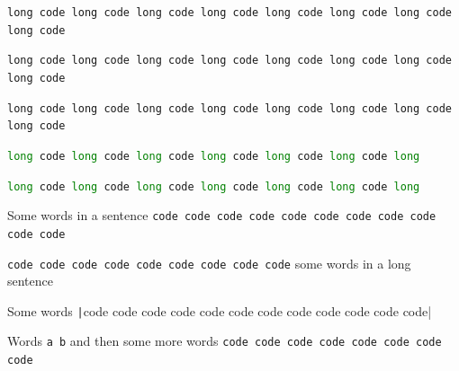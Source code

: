 \documentclass{article}
\begin{document}

\lstinline{long code long code long code long code long code long code long code long code}

\lstinline|long code long code long code long code long code long code long code long code|

\lstinline+long code long code long code long code long code long code long code long code+

\lstinline[language=Python]|long code long code long code long code long code long code long|

\lstinline[language=Python]{long code long code long code long code long code long code long}


Some words in a sentence
\lstinline{code code code code code code code code code code code}

\lstinline!code code code code code code code code code! some words
in a long sentence


Some words
\texttt|code code code code code code code code code code code code|


Words \verb|a b| and then some more words
\lstinline{code code code code code code code code}
\end{document}
